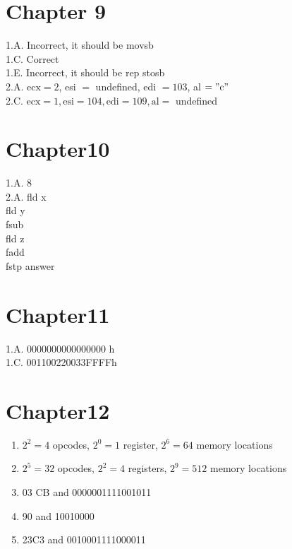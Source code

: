 \documentclass[10pt]{article}
\begin{document}
\section*{Chapter 9}
1.A. Incorrect, it should be movsb\\
1.C. Correct\\
1.E. Incorrect, it should be rep stosb\\
2.A. $\mathrm{ecx}=2$, esi $=$ undefined, edi $=103$, al $=" \mathrm{c} "$\\
2.C. $\mathrm{ecx}=1, \mathrm{esi}=104, \mathrm{edi}=109, \mathrm{al}=$ undefined

\section*{Chapter10}
1.A. 8\\
2.A. fld x\\
fld y\\
fsub\\
fld z\\
fadd\\
fstp answer

\section*{Chapter11}
1.A. 0000000000000000 h\\
1.C. 001100220033FFFFh

\section*{Chapter12}
\begin{enumerate}
  \item $2^{2}=4$ opcodes, $2^{0}=1$ register, $2^{6}=64$ memory locations
  \item $2^{5}=32$ opcodes, $2^{2}=4$ registers, $2^{9}=512$ memory locations
  \item 03 CB and 0000001111001011
  \item 90 and 10010000
  \item 23C3 and 0010001111000011
\end{enumerate}
\end{document}
